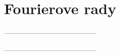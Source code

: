 \section{Fourierove rady}



---------------------------------------




---------------------------------------




